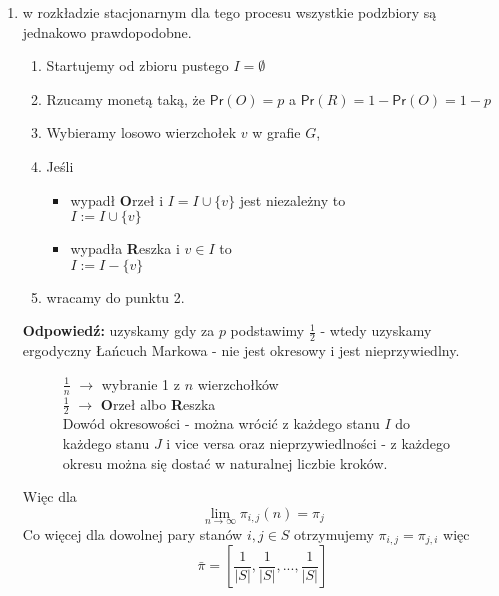 \documentclass[a4paper,12pt]{article}
\theoremstyle{definition}%
\theoremstyle{definition}
\theoremstyle{problem}
\begin{document}
\begin{enumerate}[label=\alph*)]
\item  w rozkładzie stacjonarnym dla tego procesu wszystkie podzbiory są jednakowo prawdopodobne.

\begin{enumerate}[label=\arabic*.]
\item Startujemy od zbioru pustego $I=\emptyset $
\item Rzucamy monetą taką, że $\mathsf{Pr}(O)=p$ a $\mathsf{Pr}(R)=1-\mathsf{Pr}(O)=1-p$
\item Wybieramy losowo wierzchołek $v$ w grafie $G$,
\item Jeśli 
\begin{itemize}
\item[] wypadł \textbf{O}rzeł i $I=I\cup \{v\}$ jest niezależny to\\
$I:=I\cup \{v\}$
\item[] wypadła \textbf{R}eszka i $v\in I$ to\\
$I:=I- \{v\}$
\end{itemize}
\item wracamy do punktu 2.
\end{enumerate}
\textbf{Odpowiedź: }uzyskamy gdy za $p$ podstawimy $\frac{1}{2}$ - wtedy uzyskamy ergodyczny Łańcuch Markowa - nie jest okresowy i jest nieprzywiedlny.
\begin{figure}[H]
\centering
{}
\caption*{$\frac{1}{n}$ $\rightarrow$ wybranie 1 z $n$ wierzchołków\\$\frac{1}{2}$ $\rightarrow$ \textbf{O}rzeł albo \textbf{R}eszka\\Dowód okresowości - można wrócić z każdego stanu $I$ do każdego stanu $J$ i vice versa oraz nieprzywiedlności - z każdego okresu można się dostać w naturalnej liczbie kroków.}
\end{figure}
Więc dla $$\lim _{n\to\infty}\pi _{i,j}(n)=\pi _j$$ Co więcej dla dowolnej pary stanów $i,j\in S$ otrzymujemy $\pi_{i,j}=\pi _{j,i}$ więc $$\bar{\pi}=\left[\frac{1}{|S|},\frac{1}{|S|},...,\frac{1}{|S|}\right]$$


\end{enumerate}
\end{document}
